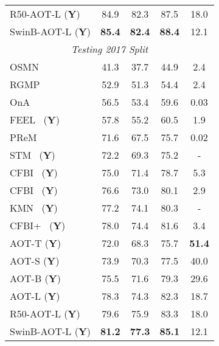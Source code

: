 \documentclass{article}
\begin{document}
\begin{table}[t!]
\begin{subtable}{.45\textwidth}
\begin{center}
\begin{tabular}{l c c c c}
R50-AOT-L (\textbf{Y}) & {84.9} & {82.3} & {87.5} & 18.0 \\
SwinB-AOT-L (\textbf{Y}) & \textbf{85.4} & \textbf{82.4} & \textbf{88.4} & 12.1 \\
\midrule[1pt]
\multicolumn{5}{c}{\textit{Testing 2017 Split}} \\
\midrule[1pt]
OSMN~\cite{osmn}  &  41.3  & 37.7  & 44.9 & 2.4 \\
RGMP~\cite{rgmp}  & 52.9 & 51.3   & 54.4 & 2.4 \\
OnA~\cite{onavos}  &  56.5  & 53.4  & 59.6 & 0.03 \\
FEEL~\cite{feelvos} (\textbf{Y})  &  57.8  &  55.2  & 60.5 & 1.9 \\
PReM~\cite{premvos}   &  71.6  &  67.5  & 75.7 & 0.02 \\
STM~\cite{spacetime} (\textbf{Y}) &  72.2  & 69.3  & 75.2 & - \\
CFBI~\cite{cfbi} (\textbf{Y}) &  75.0  & 71.4  & 78.7 & 5.3 \\
CFBI~\cite{cfbi} (\textbf{Y}) &  76.6  & 73.0  & 80.1 & 2.9 \\
KMN~\cite{KMN} (\textbf{Y})  &  77.2  & 74.1  & 80.3 & - \\
CFBI+~\cite{cfbip} (\textbf{Y}) &  78.0  & 74.4  & 81.6 & 3.4 \\

\hline
AOT-T (\textbf{Y}) & 72.0 & 68.3 & 75.7 & \textbf{51.4} \\
AOT-S (\textbf{Y}) &  73.9  & 70.3 & 77.5 & 40.0 \\
AOT-B (\textbf{Y})  &  75.5  & 71.6 & 79.3 & 29.6 \\
AOT-L (\textbf{Y})  &  78.3  & 74.3 & 82.3 & 18.7 \\
R50-AOT-L (\textbf{Y}) & {79.6} & {75.9} & {83.3} & 18.0 \\
SwinB-AOT-L (\textbf{Y}) & \textbf{81.2} & \textbf{77.3} & \textbf{85.1} & 12.1 \\

\bottomrule[1.5pt]

\end{tabular}
\end{center}

\end{subtable}

\end{table}
\end{document}
